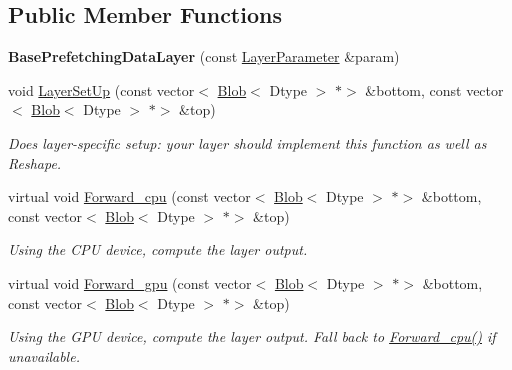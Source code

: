 \subsection*{Public Member Functions}
\begin{DoxyCompactItemize}
\item 
\mbox{\label{classcaffe_1_1_base_prefetching_data_layer_a527e2b51c73759ea5f7e28ced6a371ef}} 
{\bfseries Base\+Prefetching\+Data\+Layer} (const \mbox{\hyperlink{classcaffe_1_1_layer_parameter}{Layer\+Parameter}} \&param)
\item 
void \mbox{\hyperlink{classcaffe_1_1_base_prefetching_data_layer_ad3b7914abaa6d46c148864c0e28204ad}{Layer\+Set\+Up}} (const vector$<$ \mbox{\hyperlink{classcaffe_1_1_blob}{Blob}}$<$ Dtype $>$ $\ast$$>$ \&bottom, const vector$<$ \mbox{\hyperlink{classcaffe_1_1_blob}{Blob}}$<$ Dtype $>$ $\ast$$>$ \&top)
\begin{DoxyCompactList}\small\item\em Does layer-\/specific setup\+: your layer should implement this function as well as Reshape. \end{DoxyCompactList}\item 
\mbox{\label{classcaffe_1_1_base_prefetching_data_layer_a21fea2e38602ff125fceafe2feece212}} 
virtual void \mbox{\hyperlink{classcaffe_1_1_base_prefetching_data_layer_a21fea2e38602ff125fceafe2feece212}{Forward\+\_\+cpu}} (const vector$<$ \mbox{\hyperlink{classcaffe_1_1_blob}{Blob}}$<$ Dtype $>$ $\ast$$>$ \&bottom, const vector$<$ \mbox{\hyperlink{classcaffe_1_1_blob}{Blob}}$<$ Dtype $>$ $\ast$$>$ \&top)
\begin{DoxyCompactList}\small\item\em Using the C\+PU device, compute the layer output. \end{DoxyCompactList}\item 
\mbox{\label{classcaffe_1_1_base_prefetching_data_layer_a3cc79458a096ec130139b92f4f379aa2}} 
virtual void \mbox{\hyperlink{classcaffe_1_1_base_prefetching_data_layer_a3cc79458a096ec130139b92f4f379aa2}{Forward\+\_\+gpu}} (const vector$<$ \mbox{\hyperlink{classcaffe_1_1_blob}{Blob}}$<$ Dtype $>$ $\ast$$>$ \&bottom, const vector$<$ \mbox{\hyperlink{classcaffe_1_1_blob}{Blob}}$<$ Dtype $>$ $\ast$$>$ \&top)
\begin{DoxyCompactList}\small\item\em Using the G\+PU device, compute the layer output. Fall back to \mbox{\hyperlink{classcaffe_1_1_base_prefetching_data_layer_a21fea2e38602ff125fceafe2feece212}{Forward\+\_\+cpu()}} if unavailable. \end{DoxyCompactList}\item 

\end{DoxyCompactItemize}
